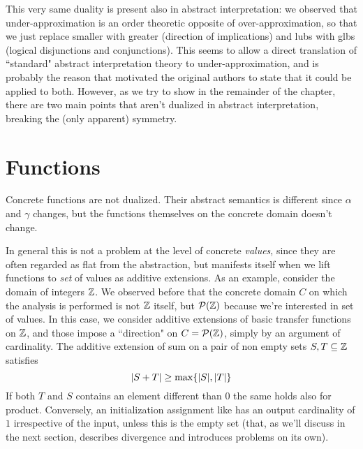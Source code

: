 This very same duality is present also in abstract interpretation: we observed that under-approximation is an order theoretic opposite of over-approximation, so that we just replace smaller with greater (direction of implications) and lubs with glbs (logical disjunctions and conjunctions).
This seems to  allow a direct translation of ``standard" abstract interpretation theory to under-approximation, and is probably the reason that motivated the original authors to state that it could be applied to both. However, as we try to show in the remainder of the chapter, there are two main points that aren't dualized in abstract interpretation, breaking the (only apparent) symmetry.

\section{Functions}
Concrete functions are not dualized. Their abstract semantics is different since $\alpha$ and $\gamma$ changes, but the functions themselves on the concrete domain doesn't change.

In general this is not a problem at the level of concrete \textit{values}, since they are often regarded as flat from the abstraction, but manifests itself when we lift functions to \textit{set} of values as additive extensions.
As an example, consider the domain of integers $\mathbb{Z}$. We observed before that the concrete domain $C$ on which the analysis is performed is not $\mathbb{Z}$ itself, but $\mathcal{P}(\mathbb{Z})$ because we're interested in set of values. In this case, we consider additive extensions of basic transfer functions on $\mathbb{Z}$, and those impose a ``direction" on $C = \mathcal{P}(\mathbb{Z})$, simply by an argument of cardinality.
The additive extension of sum on a pair of non empty sets $S, T \subseteq \mathbb{Z}$ satisfies
\[
\lvert S + T\rvert \ge \max\{ \lvert S\rvert, \lvert T\rvert \}
\]
If both $T$ and $S$ contains an element different than $0$ the same holds also for product.
Conversely, an initialization assignment like  has an output cardinality of $1$ irrespective of the input, unless this is the empty set (that, as we'll discuss in the next section, describes divergence and introduces problems on its own).

